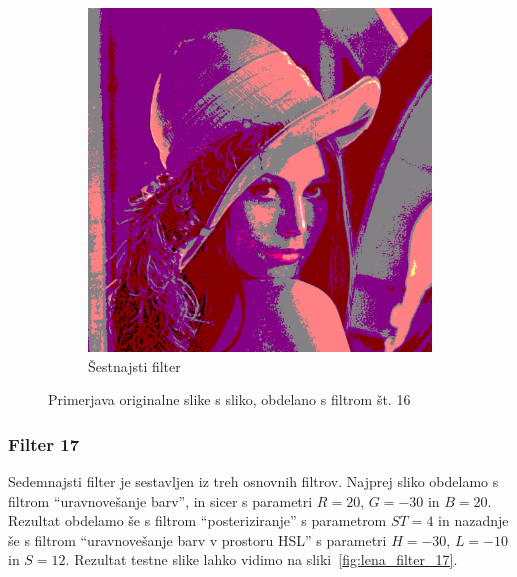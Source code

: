 \documentclass[a4paper, 12pt]{book}
\begin{document}
\begin{figure}[!ht]
\begin{subfigure}[b]{0.4\textwidth}
        \includegraphics[width=\textwidth]{lena_filter_16}
        \caption{Šestnajsti filter}
    \end{subfigure}
    \caption{Primerjava originalne slike s sliko, obdelano s filtrom št. 16}
    \label{fig:lena_filter_16}
\end{figure}


\subsubsection*{Filter 17}
Sedemnajsti filter je sestavljen iz treh osnovnih filtrov. Najprej sliko obdelamo s
filtrom ``uravnovešanje barv'', in sicer s parametri $R = 20$, $G = -30$ in
$B = 20$. Rezultat obdelamo še s filtrom ``posteriziranje'' s parametrom
$ST= 4$ in nazadnje še s filtrom ``uravnovešanje barv v prostoru HSL'' s
parametri $H = -30$, $L = -10$ in $S = 12$. Rezultat testne slike lahko
vidimo na sliki~\ref{fig:lena_filter_17}.
\end{document}
